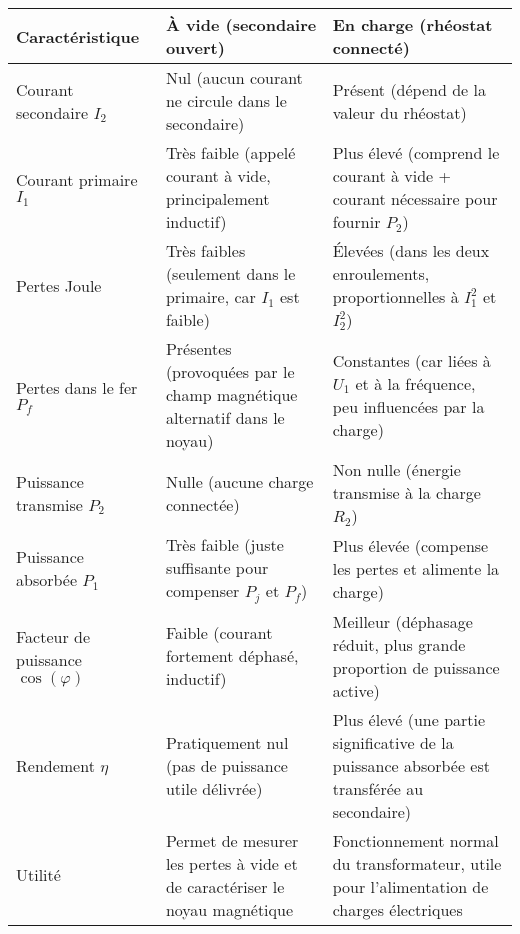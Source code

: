 \documentclass[french, 12pt]{article}
\begin{document}
\begin{table}[H]
	\centering
	\begin{tabular}{ | N{4.5cm} | N{6cm} | N{6cm} | }
		\hline
		Caractéristique & À vide (secondaire ouvert) & En charge (rhéostat connecté) \\
		\hline
		Courant secondaire $I_2$ & Nul (aucun courant ne circule dans le secondaire) & Présent (dépend de la valeur du rhéostat) \\
		\hline
		Courant primaire $I_1$ & Très faible (appelé courant à vide, principalement inductif) & Plus élevé (comprend le courant à vide + courant nécessaire pour fournir $P_2$) \\
		\hline
		Pertes Joule & Très faibles (seulement dans le primaire, car $I_1$ est faible) & Élevées (dans les deux enroulements, proportionnelles à $I_1^2$ et $I_2^2$) \\
		\hline
		Pertes dans le fer $P_f$ & Présentes (provoquées par le champ magnétique alternatif dans le noyau) & Constantes (car liées à $U_1$ et à la fréquence, peu influencées par la charge) \\
		\hline
		Puissance transmise $P_2$ & Nulle (aucune charge connectée) & Non nulle (énergie transmise à la charge $R_2$) \\
		\hline
		Puissance absorbée $P_1$ & Très faible (juste suffisante pour compenser $P_j$ et $P_f$) & Plus élevée (compense les pertes et alimente la charge) \\
		\hline
		Facteur de puissance $\cos(\varphi)$ & Faible (courant fortement déphasé, inductif) & Meilleur (déphasage réduit, plus grande proportion de puissance active) \\
		\hline
		Rendement $\eta$ & Pratiquement nul (pas de puissance utile délivrée) & Plus élevé (une partie significative de la puissance absorbée est transférée au secondaire) \\
		\hline
		Utilité & Permet de mesurer les pertes à vide et de caractériser le noyau magnétique & Fonctionnement normal du transformateur, utile pour l'alimentation de charges électriques \\
		\hline
	\end{tabular}
\end{table}
\end{document}
